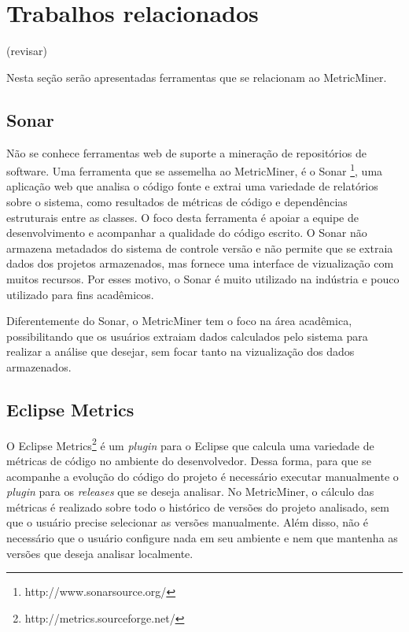 \documentclass[a4paper, 12pt, twoside]{book}
\begin{document}

\chapter{Trabalhos relacionados} \label{ch:trabalhos}

(revisar)

Nesta seção serão apresentadas ferramentas que se relacionam ao MetricMiner.
\section{Sonar}
    Não se conhece ferramentas web de suporte a mineração de repositórios de software. Uma ferramenta que se assemelha ao MetricMiner, é o Sonar \footnote{http://www.sonarsource.org/}, uma aplicação web que analisa o código fonte e extrai uma variedade de relatórios sobre o sistema, como resultados de métricas de código e dependências estruturais entre as classes. O foco desta ferramenta é apoiar a equipe de desenvolvimento e acompanhar a qualidade do código escrito. O Sonar não armazena metadados do sistema de controle versão e não permite que se extraia dados dos projetos armazenados, mas fornece uma interface de vizualização com muitos recursos. Por esses motivo, o Sonar é muito utilizado na indústria e pouco utilizado para fins acadêmicos.
    
    Diferentemente do Sonar, o MetricMiner tem o foco na área acadêmica, possibilitando que os usuários extraiam dados calculados pelo sistema para realizar a análise que desejar, sem focar tanto na vizualização dos dados armazenados.

\section{Eclipse Metrics}
    O Eclipse Metrics\footnote{http://metrics.sourceforge.net/} é um \textit{plugin} para o Eclipse que calcula uma variedade de métricas de código no ambiente do desenvolvedor. Dessa forma, para que se acompanhe a evolução do código do projeto é necessário executar manualmente o \textit{plugin} para os \textit{releases} que se deseja analisar. No MetricMiner, o cálculo das métricas é realizado sobre todo o histórico de versões do projeto analisado, sem que o usuário precise selecionar as versões manualmente. Além disso, não é necessário que o usuário configure nada em seu ambiente e nem que mantenha as versões que deseja analisar localmente.
    
\end{document}
